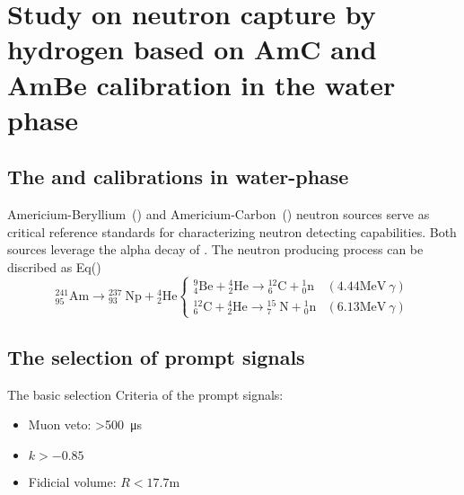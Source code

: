 \section{Study on neutron capture by hydrogen based on AmC and AmBe calibration in the water phase}
\subsection{The  and  calibrations in water-phase}
Americium-Beryllium~() and Americium-Carbon~() neutron sources serve as critical reference standards for characterizing neutron detecting capabilities. Both sources leverage the alpha decay of . The neutron producing process can be discribed as Eq()
\begin{equation}
	\label{amn}
	{ }_{95}^{241} \mathrm{Am} \rightarrow{ }_{93}^{237} \mathrm{~Np}+{ }_2^4 \mathrm{He} \begin{cases}{ }_4^9 \mathrm{Be}+{ }_2^4 \mathrm{He} \rightarrow{ }_6^{12} \mathrm{C}+{ }_0^1 \mathrm{n} & (4.44 \mathrm{MeV}~\gamma) \\ { }_6^{12} \mathrm{C}+{ }_2^4 \mathrm{He} \rightarrow{ }_7^{15} \mathrm{~N}+{ }_0^1 \mathrm{n} & (6.13 \mathrm{MeV}~\gamma)\end{cases}
\end{equation}
\subsection{The selection of prompt signals}
The basic selection Criteria of the prompt signals:
\begin{itemize}
	\item Muon veto: >\SI{500}{\micro s}
	\item $k>-0.85$
	\item Fidicial volume: $R<17.7$\si{m}
\end{itemize}


